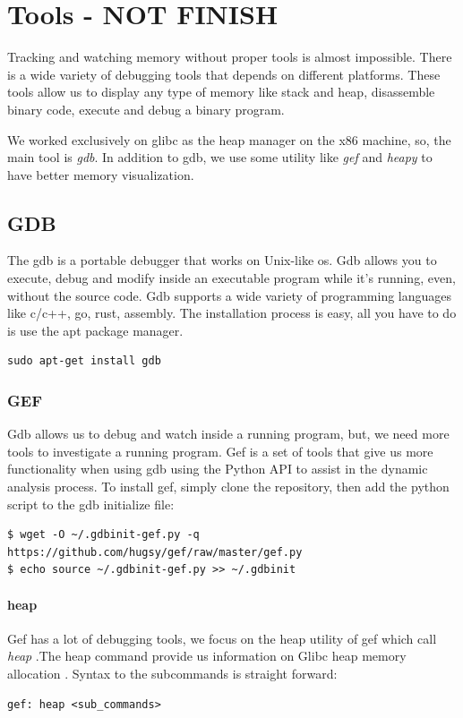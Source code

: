 \documentclass{masterthesis}
\newcommand*\libc{glibc}
\begin{document}
\chapter{Tools -  NOT FINISH}
Tracking and watching memory without proper tools is almost impossible. There is a wide variety of debugging tools that depends on different platforms. These tools allow us to display any type of memory like stack and heap, disassemble binary code, execute and debug a binary program. 

We worked exclusively on \libc{} as the heap manager on the x86 machine, so, the main tool is \emph{gdb}. In addition to gdb, we use some utility like \emph{gef} and \emph{heapy} to have better memory visualization. 


\section{GDB}
The gdb is a portable debugger that works on Unix-like os. Gdb allows you to execute, debug and modify inside an executable program while it's running, even, without the source code. Gdb supports a wide variety of programming languages like c/c++, go, rust, assembly. The installation process is easy, all you have to do is use the apt package manager.
\begin{lstlisting}[frame=tlrb]
sudo apt-get install gdb
\end{lstlisting}

\subsection{GEF}
Gdb allows us to debug and watch inside a running program, but, we need more tools to investigate a running program. Gef is a set of tools that give us more functionality when using gdb using the Python API to assist in the dynamic analysis process. To install gef, simply clone the repository, then add the python script to the gdb initialize file:
\begin{lstlisting}[frame=tlrb]
$ wget -O ~/.gdbinit-gef.py -q https://github.com/hugsy/gef/raw/master/gef.py
$ echo source ~/.gdbinit-gef.py >> ~/.gdbinit
\end{lstlisting}

\subsubsection{heap}
Gef has a lot of debugging tools, we focus on the heap utility of gef which call \emph{heap} .The heap command provide us information on Glibc heap memory allocation . Syntax to the subcommands is straight forward:
\begin{lstlisting}[frame=tlrb]
gef: heap <sub_commands>
\end{lstlisting}
\end{document}
